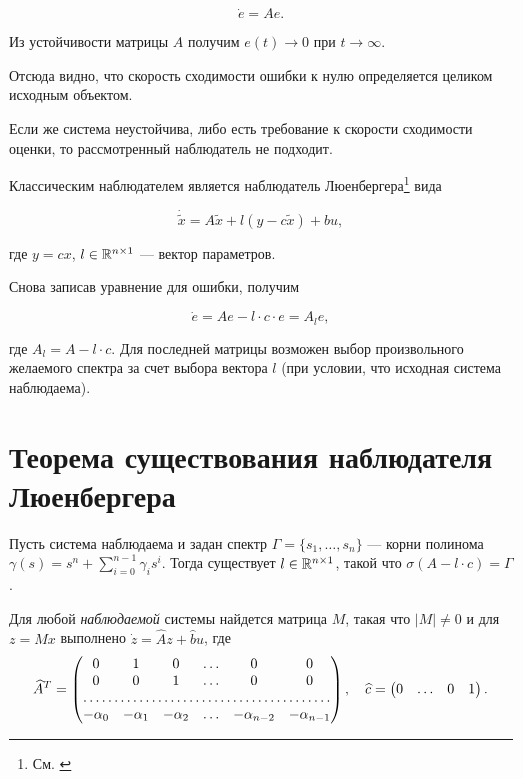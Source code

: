 \documentclass[../../TAU.tex]{subfiles}
\begin{document}
    $$
        \dot e = A e.
    $$
    
    Из устойчивости матрицы $A$ получим $e(t)\rightarrow0$ при $t\rightarrow\infty$.

    Отсюда видно, что скорость сходимости ошибки к нулю определяется целиком исходным объектом.

    Если же система неустойчива, либо есть требование к скорости сходимости оценки, то рассмотренный наблюдатель не подходит.

    Классическим наблюдателем является наблюдатель Люенбергера\footnote{См. \cite[стр. 119]{andr}} вида
    
    $$
        \dot{\tilde x} = A\tilde x + l (y-c\tilde x) + b u,
    $$
    
    где $y = cx$, $l\in\mathbb{R}^{n\times 1}$ --- вектор параметров.

    Снова записав уравнение для ошибки, получим
    
    $$
        \dot e = A e - l\cdot c\cdot e = A_l e,
    $$
    
    где $A_l = A-l\cdot c$. Для последней матрицы возможен выбор произвольного желаемого спектра за счет выбора вектора $l$ (при условии, что исходная система наблюдаема).

\section{Теорема существования наблюдателя Люенбергера}

    \begin{theor}
        Пусть система  наблюдаема и задан спектр $\Gamma=\{s_1,\ldots, s_n\}$ --- корни полинома $\gamma(s)=s^n+\sum_{i=0}^{n-1}\gamma_i s^i$.
        Тогда существует $l\in\mathbb{R}^{n\times 1}$, такой что $\sigma(A-l\cdot c) = \Gamma$.
    \end{theor}

    \begin{statement}
        Для любой {\it наблюдаемой} системы  найдется матрица $M$, такая что $|M|\neq0$ и для $z=Mx$ выполнено
        $\dot z = \widehat A z + \widehat b u$,
        где
        $$
        \widehat A^T =
        \begin{pmatrix}
            0& 1& 0& \ldots& 0& 0   \\
            0& 0& 1& \ldots& 0& 0   \\
            \hdotsfor{6}            \\
            -\alpha_0& -\alpha_1& -\alpha_2 &\ldots& -\alpha_{n-2}& -\alpha_{n-1}
        \end{pmatrix},
        \quad
        \widehat c=
        \begin{pmatrix}
            0 & \ldots & 0 & 1
        \end{pmatrix}.
        $$
    \end{statement}
\end{document}
